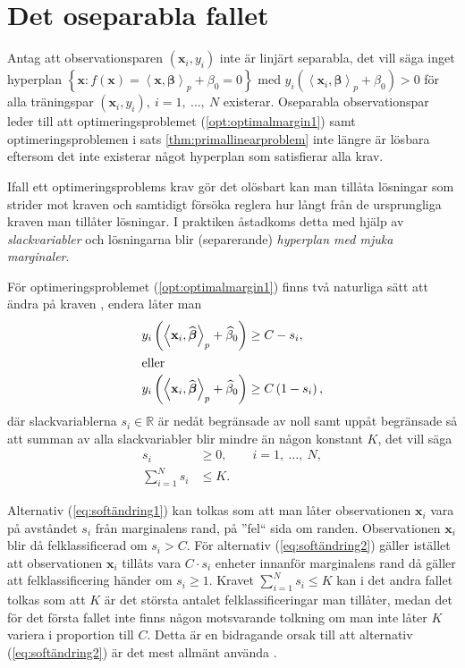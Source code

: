 \documentclass[a4paper, 12pt]{report}
\theoremstyle{definition}
\theoremstyle{remark}
\newcommand{\bfbeta}{{\boldsymbol{\beta}}}
\newcommand{\bfx}{\mathbf{x}}
\newcommand{\llangle}{\left\langle}
\newcommand{\rrangle}{\right\rangle}
\newcommand{\inner}[2]{\llangle #1, #2 \rrangle}
\begin{document}
\section{Det oseparabla fallet}
Antag att observationsparen $\left(\mathbf{x}_i, y_i\right)$ inte är linjärt separabla, det vill säga inget hyperplan $\left\{\mathbf{x} : f\left(\mathbf{x}\right) = \inner{\bfx}{\bfbeta}_p + \beta_0 = 0 \right\}$ med $y_i\left(\inner{\bfx_i}{\bfbeta}_p+\beta_0\right)>0$ för alla träningspar $\left(\mathbf{x}_i, y_i\right),~i=1,~\dots,~N$ existerar. Oseparabla observationspar leder till att optimeringsproblemet (\ref{opt:optimalmargin1}) samt optimeringsproblemen i sats \ref{thm:primallinearproblem} inte längre är lösbara eftersom det inte existerar något hyperplan som satisfierar alla krav.

Ifall ett optimeringsproblems krav gör det olösbart kan man tillåta lösningar som strider mot kraven och samtidigt försöka reglera hur långt från de ursprungliga kraven man tillåter lösningar. I praktiken åstadkoms detta med hjälp av \emph{slackvariabler} och lösningarna blir (separerande) \emph{hyperplan med mjuka marginaler}.

För optimeringsproblemet (\ref{opt:optimalmargin1}) finns två naturliga sätt att ändra på kraven \cite{ESL}, endera låter man
\begin{align}
	y_i\left(\inner{\bfx_i}{\widehat{\bfbeta}}_p+\widehat{\beta}_0\right) &\geq C-s_i,\label{eq:softändring1}\\
	\intertext{eller}
	y_i\left(\inner{\bfx_i}{\widehat{\bfbeta}}_p+\widehat{\beta}_0\right) &\geq C\left(1-s_i\right),\label{eq:softändring2}
\end{align}
där slackvariablerna $s_i\in\mathbb{R}$ är nedåt begränsade av noll samt uppåt begränsade så att summan av alla slackvariabler blir mindre än någon konstant $K$, det vill säga \begin{equation*}
\begin{aligned}
s_i&\geq0,\qquad i=1,~\dots,~N,\\
\sum_{i=1}^{N}s_i&\leq K.
\end{aligned}
\end{equation*}

Alternativ (\ref{eq:softändring1}) kan tolkas som att man låter observationen $\mathbf{x}_i$ vara på avståndet $s_i$ från marginalens rand, på ''fel`` sida om randen. Observationen $\mathbf{x}_i$ blir då felklassificerad om $s_i>C$. För alternativ (\ref{eq:softändring2}) gäller istället att observationen $\mathbf{x}_i$ tillåts vara $C\cdot s_i$ enheter innanför marginalens rand då gäller att felklassificering händer om $s_i\geq1$. Kravet $\sum_{i=1}^{N} s_i \leq K$ kan i det andra fallet tolkas som att $K$ är det största antalet felklassificeringar man tillåter, medan det för det första fallet inte finns någon motsvarande tolkning om man inte låter $K$ variera i proportion till $C$. Detta är en bidragande orsak till att alternativ (\ref{eq:softändring2}) är det mest allmänt använda \cite{ESL}.
\end{document}
